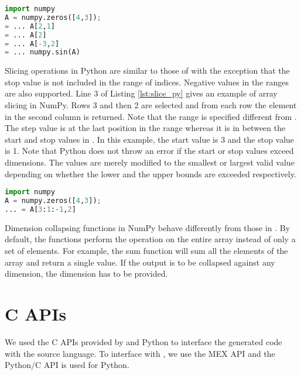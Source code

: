 \begin{lstlisting}[float, language=python, label={lst:index_py}, caption={An example of indexing in NumPy}]
import numpy
A = numpy.zeros([4,3]);
= ... A[2,1]
= ... A[2]
= ... A[-3,2]
= ... numpy.sin(A)
\end{lstlisting}

Slicing operations in Python are similar to those of \matlab with the exception that the stop value is not included in the range of indices. Negative values in the ranges are also supported. Line 3 of Listing \ref{lst:slice_py} gives an example of array slicing in NumPy. Rows 3 and then 2 are selected and from each row the element in the second column is returned. Note that the range is specified different from \matlab. The step value is at the last position in the range whereas it is in between the start and stop values in \matlab. In this example, the start value is 3 and the stop value is 1. Note that Python does not throw an error if the start or stop values exceed dimensions. The values are merely modified to the smallest or largest valid value depending on whether the lower and the upper bounds are exceeded respectively. 
\begin{lstlisting}[float,language=python, label={lst:slice_py}, caption={An example of array slicing in NumPy}]
import numpy
A = numpy.zeros([4,3]);
... = A[3:1:-1,2]
\end{lstlisting}

Dimension collapsing functions in NumPy behave differently from those in \matlab. By default, the functions perform the operation on the entire array instead of only a set of elements. For example, the \textsf{sum} function will sum all the elements of the array and return a single value. If the output is to be collapsed against any dimension, the dimension has to be provided. 

\section{C APIs}
We used the C APIs provided by \matlab and Python to interface the generated code with the source language. To interface with \matlab, we use the MEX\cite{mex} API and the Python/C\cite{pyc} API is used for Python. 
